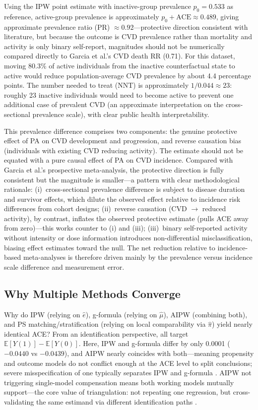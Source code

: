 \documentclass[12pt,a4paper]{article}
\newcommand{\E}{\mathbb{E}}
\begin{document}
Using the IPW point estimate with inactive-group prevalence $p_0=0.533$ as reference, active-group prevalence is approximately $p_0+\mathrm{ACE}\approx 0.489$, giving approximate prevalence ratio (PR) $\approx 0.92$---protective direction consistent with literature, but because the outcome is CVD prevalence rather than mortality and activity is only binary self-report, magnitudes should not be numerically compared directly to Garcia et al.'s \cite{garcia2023meta} CVD death RR (0.71). For this dataset, moving 80.3\% of active individuals from the inactive counterfactual state to active would reduce population-average CVD prevalence by about 4.4 percentage points. The number needed to treat (NNT) is approximately $1/0.044\approx 23$: roughly 23 inactive individuals would need to become active to prevent one additional case of prevalent CVD (an approximate interpretation on the cross-sectional prevalence scale), with clear public health interpretability.

This prevalence difference comprises two components: the genuine protective effect of PA on CVD development and progression, and reverse causation bias (individuals with existing CVD reducing activity). The estimate should not be equated with a pure causal effect of PA on CVD incidence. Compared with Garcia et al.'s \cite{garcia2023meta} prospective meta-analysis, the protective direction is fully consistent but the magnitude is smaller---a pattern with clear methodological rationale: (i)~cross-sectional prevalence difference is subject to disease duration and survivor effects, which dilute the observed effect relative to incidence risk differences from cohort designs; (ii)~reverse causation (CVD $\to$ reduced activity), by contrast, inflates the observed protective estimate (pulls ACE away from zero)---this works counter to (i) and (iii); (iii)~binary self-reported activity without intensity or dose information introduces non-differential misclassification, biasing effect estimates toward the null. The net reduction relative to incidence-based meta-analyses is therefore driven mainly by the prevalence versus incidence scale difference and measurement error.

\subsection{Why Multiple Methods Converge}

Why do IPW (relying on $\hat e$), g-formula (relying on $\hat\mu$), AIPW (combining both), and PS matching/stratification (relying on local comparability via $\hat\pi$) yield nearly identical ACE? From an identification perspective, all target $\E[Y(1)]-\E[Y(0)]$. Here, IPW and g-formula differ by only 0.0001 ($-0.0440$ vs $-0.0439$), and AIPW nearly coincides with both---meaning propensity and outcome models do not conflict enough at the ACE level to split conclusions; severe misspecification of one typically separates IPW and g-formula \cite{shahu2023comparison}. AIPW not triggering single-model compensation means both working models mutually support---the core value of triangulation: not repeating one regression, but cross-validating the same estimand via different identification paths \cite{shahu2023comparison,hernan2024whatif}.
\end{document}
